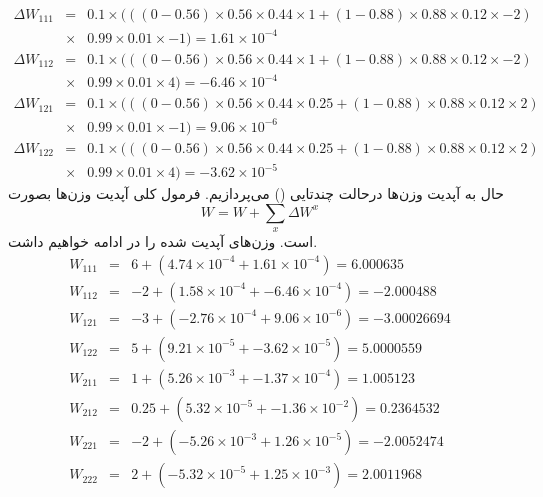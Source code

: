 \documentclass[12pt]{article}
\begin{document}
\begin{eqnarray*}
	\Delta W_{111}&=&0.1\times(((0-0.56)\times0.56\times0.44\times1+(1-0.88)\times0.88\times0.12\times-2)\\
	&\times&0.99\times0.01\times-1)=1.61\times10^{-4}\\	
	\Delta W_{112}&=&0.1\times(((0-0.56)\times0.56\times0.44\times1+(1-0.88)\times0.88\times0.12\times-2)\\
	&\times&0.99\times0.01\times4)=-6.46\times10^{-4}\\	
	\Delta
	W_{121}&=&0.1\times(((0-0.56)\times0.56\times0.44\times0.25+(1-0.88)\times0.88\times0.12\times2)\\
	&\times&0.99\times0.01\times-1)=9.06\times10^{-6}\\
	\Delta W_{122}&=&0.1\times(((0-0.56)\times0.56\times0.44\times0.25+(1-0.88)\times0.88\times0.12\times2)\\
	&\times&0.99\times0.01\times4)=-3.62\times10^{-5}
	\end{eqnarray*}
	حال به آپدیت وزن‌ها درحالت چندتایی () می‌پردازیم. فرمول کلی آپدیت وزن‌ها بصورت $$W = W+ \sum_{x}\Delta W^{x}$$ است. وزن‌های آپدیت شده را در ادامه خواهیم داشت.
	\begin{eqnarray*}
		W_{111} &=& 6 + (4.74\times10^{-4} + 1.61\times10^{-4}) = 6.000635\\
		W_{112} &=& -2 + (1.58\times10^{-4} + -6.46\times10^{-4} ) = -2.000488\\
		W_{121} &=& -3 + (-2.76\times10^{-4} + 9.06\times10^{-6}) = -3.00026694\\
		W_{122} &=& 5 + (9.21\times10^{-5} + -3.62\times10^{-5}) = 5.0000559\\
		W_{211} &=& 1+(5.26\times10^{-3} + -1.37\times10^{-4}) = 1.005123\\
		W_{212} &=& 0.25+(5.32\times10^{-5} + -1.36\times10^{-2}) = 0.2364532\\
		W_{221} &=& -2 + (-5.26\times10^{-3} + 1.26\times10^{-5}) = -2.0052474\\
		W_{222} &=& 2 + (-5.32\times10^{-5} + 1.25\times10^{-3}) = 2.0011968
 	\end{eqnarray*}
\end{document}
